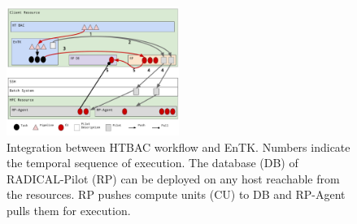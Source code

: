 \begin{figure}
\centering
  \includegraphics[width=0.5\textwidth]{FIGURES/ht-bac-rp_integration.pdf}
  \caption{Integration between HTBAC workflow and EnTK\@. Numbers indicate
  the temporal sequence of execution. The database (DB) of RADICAL-Pilot (RP)
  can be deployed on any host reachable from the resources. RP pushes compute
  units (CU) to DB and RP-Agent pulls them for execution. }
  \label{figure:ht-bac_rp}
\end{figure}


